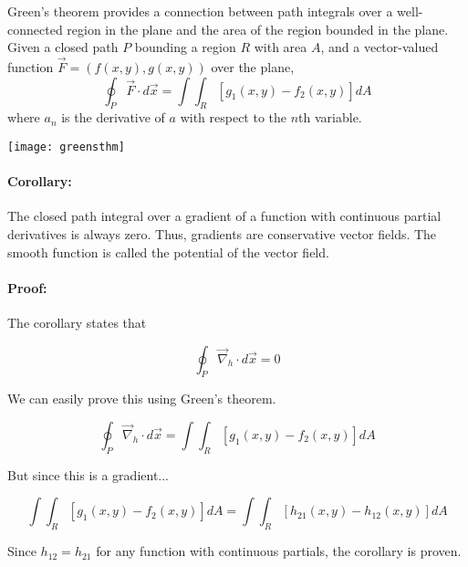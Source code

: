 \documentclass[12pt]{article}
\begin{document}
Green's theorem provides a connection between path integrals over a well-connected region in the plane and the area of the region bounded in the plane. Given a closed path $P$ bounding a region $R$ with area $A$, and a vector-valued function $\vec{F}=(f(x,y),g(x,y))$ over the plane,
$$\oint_P\vec{F}\cdot d\vec{x} = \int\!\!\!\int_{\!\!R} [g_1(x,y) - f_2(x,y)] dA$$
where $a_n$ is the derivative of $a$ with respect to the $n$th variable.
\begin{center}
\texttt{[image: greensthm]}
\end{center}

\paragraph{Corollary:}

The closed path integral over a gradient of a function with continuous partial derivatives is always zero. Thus, gradients are conservative vector fields. The smooth function is called the potential of the vector field.

\paragraph{Proof:}

The corollary states that

$$\oint_P\vec{\nabla}_h\cdot d\vec{x} = 0$$

We can easily prove this using Green's theorem.

$$\oint_P\vec{\nabla}_h\cdot d\vec{x} = \int\!\!\!\int_{\!\!R} [g_1(x,y) - f_2(x,y)] dA$$

But since this is a gradient...

$$\int\!\!\!\int_{\!\!R} [g_1(x,y) - f_2(x,y)] dA = \int\!\!\!\int_{\!\!R} [h_{21}(x,y) - h_{12}(x,y)] dA$$

Since $h_{12}=h_{21}$ for any function with continuous partials, the corollary is proven.
\end{document}
